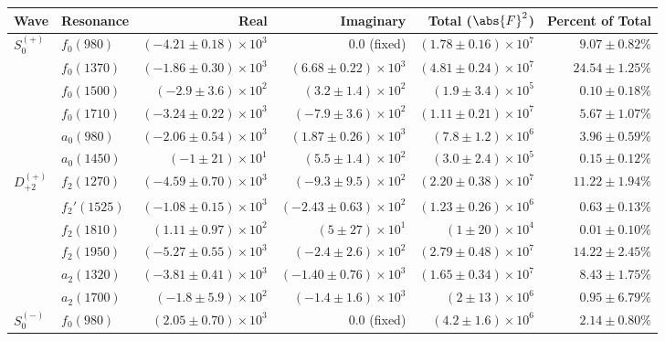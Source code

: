 \begin{table}[ht]
    \begin{center}
        \begin{tabular}{llrrrr}\toprule
        Wave & Resonance & Real & Imaginary & Total ($\abs{F}^2$) & Percent of Total \\\midrule
$S_{0}^{(+)}$ & $f_{0}(980)$ & $(-4.21 \pm 0.18) \times 10^{3}$ & $0.0$ (fixed) & $(1.78 \pm 0.16) \times 10^{7}$ & $9.07 \pm 0.82 \%$ \\
 & $f_{0}(1370)$ & $(-1.86 \pm 0.30) \times 10^{3}$ & $(6.68 \pm 0.22) \times 10^{3}$ & $(4.81 \pm 0.24) \times 10^{7}$ & $24.54 \pm 1.25 \%$ \\
 & $f_{0}(1500)$ & $(-2.9 \pm 3.6) \times 10^{2}$ & $(3.2 \pm 1.4) \times 10^{2}$ & $(1.9 \pm 3.4) \times 10^{5}$ & $0.10 \pm 0.18 \%$ \\
 & $f_{0}(1710)$ & $(-3.24 \pm 0.22) \times 10^{3}$ & $(-7.9 \pm 3.6) \times 10^{2}$ & $(1.11 \pm 0.21) \times 10^{7}$ & $5.67 \pm 1.07 \%$ \\
 & $a_{0}(980)$ & $(-2.06 \pm 0.54) \times 10^{3}$ & $(1.87 \pm 0.26) \times 10^{3}$ & $(7.8 \pm 1.2) \times 10^{6}$ & $3.96 \pm 0.59 \%$ \\
 & $a_{0}(1450)$ & $(-1 \pm 21) \times 10^{1}$ & $(5.5 \pm 1.4) \times 10^{2}$ & $(3.0 \pm 2.4) \times 10^{5}$ & $0.15 \pm 0.12 \%$ \\
$D_{+2}^{(+)}$ & $f_{2}(1270)$ & $(-4.59 \pm 0.70) \times 10^{3}$ & $(-9.3 \pm 9.5) \times 10^{2}$ & $(2.20 \pm 0.38) \times 10^{7}$ & $11.22 \pm 1.94 \%$ \\
 & $f_{2}'(1525)$ & $(-1.08 \pm 0.15) \times 10^{3}$ & $(-2.43 \pm 0.63) \times 10^{2}$ & $(1.23 \pm 0.26) \times 10^{6}$ & $0.63 \pm 0.13 \%$ \\
 & $f_{2}(1810)$ & $(1.11 \pm 0.97) \times 10^{2}$ & $(5 \pm 27) \times 10^{1}$ & $(1 \pm 20) \times 10^{4}$ & $0.01 \pm 0.10 \%$ \\
 & $f_{2}(1950)$ & $(-5.27 \pm 0.55) \times 10^{3}$ & $(-2.4 \pm 2.6) \times 10^{2}$ & $(2.79 \pm 0.48) \times 10^{7}$ & $14.22 \pm 2.45 \%$ \\
 & $a_{2}(1320)$ & $(-3.81 \pm 0.41) \times 10^{3}$ & $(-1.40 \pm 0.76) \times 10^{3}$ & $(1.65 \pm 0.34) \times 10^{7}$ & $8.43 \pm 1.75 \%$ \\
 & $a_{2}(1700)$ & $(-1.8 \pm 5.9) \times 10^{2}$ & $(-1.4 \pm 1.6) \times 10^{3}$ & $(2 \pm 13) \times 10^{6}$ & $0.95 \pm 6.79 \%$ \\
$S_{0}^{(-)}$ & $f_{0}(980)$ & $(2.05 \pm 0.70) \times 10^{3}$ & $0.0$ (fixed) & $(4.2 \pm 1.6) \times 10^{6}$ & $2.14 \pm 0.80 \%$ \\

\end{tabular}
\end{center}
\end{table}
